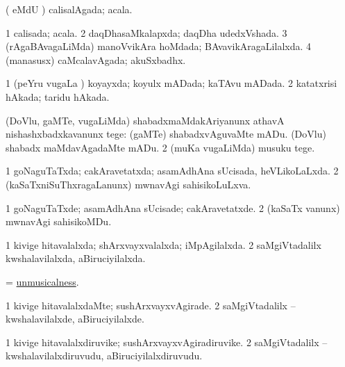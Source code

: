 \bentry
{} 
\gl{\gu}
\expl{}
\bmng
( eMdU \parx) calisalAgada; acala. 
\emng
\eentry

\bentry
{} 
\gl{\gu}
\expl{}
\bmng
\bnum
\num{1} calisada; acala. 
\num{2} daqDhasaMkalapxda; daqDha udedxVshada. 
\num{3} (rAgaBAvagaLiMda) manoVvikAra hoMdada; BAvavikAragaLilalxda. 
\num{4} (manasusx) caMcalavAgada; akuSxbadhx. 
\enum
\emng
\eentry

\bentry
{} 
\gl{\gu}
\bmng
\bnum
\num{1} (peYru \mo vugaLa \vi) koyayxda; koyulx mADada; kaTAvu mADada. 
\num{2} katatxrisi hAkada; taridu hAkada. 
\enum
\emng
\eentry

\bentry
{} 
\gl{\sakirx}
\expl{}
\bmng
\bnum
{} (DoVlu, gaMTe, \mo vugaLiMda) shabadxmaMdakAriyanunx athavA nishashxbadxkavanunx tege: 
\banum
{} (gaMTe) shabadxvAguvaMte mADu. 
 (DoVlu) shabadx maMdavAgadaMte mADu. 
\eanum
\numie
\num{2} (muKa \mo vugaLiMda) musuku tege. 
\enum
\emng
\eentry

\bentry
{} 
\gl{\gu}
\expl{}
\bmng
\bnum
\num{1} goNaguTaTxda; cakAravetatxda; asamAdhAna sUcisada, heVLikoLaLxda. 
\num{2} (kaSaTxniSuThxragaLanunx) mwnavAgi sahisikoLuLxva. 
\enum
\emng
\eentry

\bentry
{} 
\gl{\kirxvi}
\expl{}
\bmng
\bnum
\num{1} goNaguTaTxde; asamAdhAna sUcisade; cakAravetatxde. 
\num{2} (kaSaTx \mo vanunx) mwnavAgi sahisikoMDu. 
\enum
\emng
\eentry

\bentry
{} 
\gl{\gu}
\expl{}
\bmng
\bnum
\num{1} kivige hitavalalxda; shArxvayxvalalxda; iMpAgilalxda. 
\num{2} saMgiVtadalilx kwshalavilalxda, aBiruciyilalxda. 
\enum
\emng
\eentry

\bentry
{} 
\gl{\nA}
\expl{}
\bmng
= \hyperlink{unmusicalness}{unmusicalness}. 
\emng
\eentry

\bentry
{} 
\gl{\kirxvi}
\expl{}
\bmng
\bnum
\num{1} kivige hitavalalxdaMte; sushArxvayxvAgirade. 
\num{2} saMgiVtadalilx -- kwshalavilalxde, aBiruciyilalxde. 
\enum
\emng
\eentry

\bentry
{} 
\gl{\nA}
\expl{}
\bmng
\bnum
\num{1} kivige hitavalalxdiruvike; sushArxvayxvAgiradiruvike. 
\num{2} saMgiVtadalilx -- kwshalavilalxdiruvudu, aBiruciyilalxdiruvudu. 
\enum
\emng
\eentry


